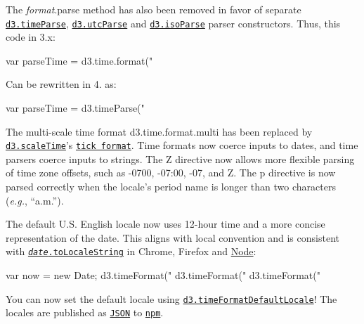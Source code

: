 The {\itshape format}.parse method has also been removed in favor of separate \href{https://github.com/d3/d3-time-format/blob/master/README.md#timeParse}{\tt d3.\+time\+Parse}, \href{https://github.com/d3/d3-time-format/blob/master/README.md#utcParse}{\tt d3.\+utc\+Parse} and \href{https://github.com/d3/d3-time-format/blob/master/README.md#isoParse}{\tt d3.\+iso\+Parse} parser constructors. Thus, this code in 3.\+x\+:


\begin{DoxyCode}
var parseTime = d3.time.format("%
\end{DoxyCode}


Can be rewritten in 4. as\+:


\begin{DoxyCode}
var parseTime = d3.timeParse("%
\end{DoxyCode}


The multi-\/scale time format d3.\+time.\+format.\+multi has been replaced by \href{https://github.com/d3/d3-scale/blob/master/README.md#scaleTime}{\tt d3.\+scale\+Time}’s \href{https://github.com/d3/d3-scale/blob/master/README.md#time_tickFormat}{\tt tick format}. Time formats now coerce inputs to dates, and time parsers coerce inputs to strings. The {\ttfamily Z} directive now allows more flexible parsing of time zone offsets, such as {\ttfamily -\/0700}, {\ttfamily -\/07\+:00}, {\ttfamily -\/07}, and {\ttfamily Z}. The {\ttfamily p} directive is now parsed correctly when the locale’s period name is longer than two characters ({\itshape e.\+g.}, “a.\+m.\+”).

The default U.\+S. English locale now uses 12-\/hour time and a more concise representation of the date. This aligns with local convention and is consistent with \href{https://developer.mozilla.org/en-US/docs/Web/JavaScript/Reference/Global_Objects/Date/toLocaleString}{\tt {\itshape date}.to\+Locale\+String} in Chrome, Firefox and \mbox{\hyperlink{classNode}{Node}}\+:


\begin{DoxyCode}
var now = new Date;
d3.timeFormat("%
d3.timeFormat("%
d3.timeFormat("%
\end{DoxyCode}


You can now set the default locale using \href{https://github.com/d3/d3-time-format/blob/master/README.md#timeFormatDefaultLocale}{\tt d3.\+time\+Format\+Default\+Locale}! The locales are published as \href{https://github.com/d3/d3-request/blob/master/README.md#json}{\tt J\+S\+ON} to \href{https://unpkg.com/d3-time-format/locale/}{\tt npm}.

